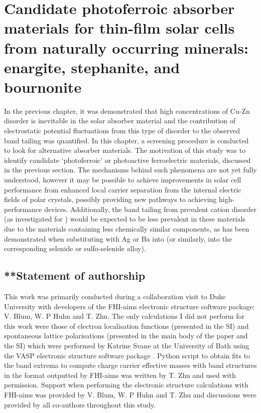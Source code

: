 \documentclass[11pt, twoside]{report}
\begin{document}
\section{Candidate photoferroic absorber materials for thin-film
solar cells from naturally occurring minerals:
enargite, stephanite, and bournonite}\label{sulfosalts1}


In the previous chapter, it was demonstrated that high concentrations of Cu-Zn disorder is inevitable in the solar absorber material {\CZTS} and the contribution of electrostatic potential fluctuations from this type of disorder to the observed band tailing was quantified. In this chapter, a screening procedure is conducted to look for alternative absorber materials. The motivation of this study was to identify candidate `photoferroic' or photoactive ferroelectric materials, discussed in the previous section. The mechanisms behind such phenomena are not yet fully understood, however it may be possible to achieve improvements in solar cell performance from enhanced local carrier separation from the internal electric fields of polar crystals, possibly providing new pathways to achieving high-performance devices.
Additionally, the band tailing from prevalent cation disorder (as investigated for {\CZTS}) would be expected to be less prevalent in these materials due to the materials containing less chemically similar components, as has been demonstrated when substituting with Ag \cite{Gerschon_AZTSe} or Ba \cite{distant_cations, Tong_Ba-CZTS} into {\CZTS} (or similarly, into the corresponding selenide or sulfo-selenide alloy).

\subsection{**Statement of authorship}
This work was primarily conducted during a collaboration visit to Duke University with developers of the FHI-aims \cite{FHI-aims} electronic structure software package: V. Blum, W. P Huhn and T. Zhu. The only calculations I did not perform for this work were those of electron localisation functions (presented in the SI) and spontaneous lattice polarisations (presented in the main body of the paper and the SI) which were performed by Katrine Svane at the University of Bath using the VASP electronic structure software package \cite{VASP}. Python script to obtain fits to the band extrema to compute charge carrier effective masses with band structures in the format outputted by FHI-aims was written by T. Zhu and used with permission. Support when performing the electronic structure calculations with FHI-aims was provided by V. Blum, W. P Huhn and T. Zhu and discussions were provided by all co-authors throughout this study.
\end{document}
